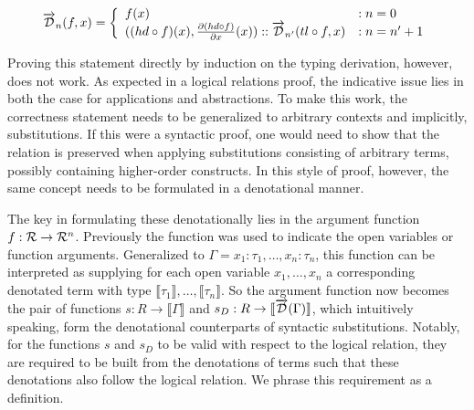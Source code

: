   \begin{equation}
    \overrightarrow{\mathcal{D}}_n(f, x) =
      \left\{
        \begin{array}{ll}
          f(x) & : n = 0 \\
          ((hd \circ f)(x), \frac{\partial{(hd \circ f)}}{\partial{x}}(x)) :: \overrightarrow{\mathcal{D}}_{n'}(tl \circ f, x) & : n = n' + 1 \\
        \end{array}
      \right.
  \label{eqn:argument_df}
  \end{equation}

  Proving this statement directly by induction on the typing derivation, however, does not work.
  As expected in a logical relations proof, the indicative issue lies in both the case for applications and abstractions.
  To make this work, the correctness statement needs to be generalized to arbitrary contexts and implicitly, substitutions.
  If this were a syntactic proof, one would need to show that the relation is preserved when applying substitutions consisting of arbitrary terms, possibly containing higher-order constructs.
  In this style of proof, however, the same concept needs to be formulated in a denotational manner.

  The key in formulating these denotationally lies in the argument function $f : \mathcal{R} \to \mathcal{R}^n$.
  Previously the function was used to indicate the open variables or function arguments.
  Generalized to $\Gamma = x_1 : \tau_1, \dots, x_n : \tau_n$, this function can be interpreted as supplying for each open variable $x_1, \dots, x_n$ a corresponding denotated term with type $\llbracket \tau_1 \rrbracket, \dots, \llbracket \tau_n \rrbracket$.
  So the argument function now becomes the pair of functions $s : R \rightarrow \llbracket \Gamma \rrbracket$ and $s_D : R \rightarrow \llbracket \overrightarrow{\mathcal{D}}(\Gamma) \rrbracket$, which intuitively speaking, form the denotational counterparts of syntactic substitutions.
  Notably, for the functions $s$ and $s_D$ to be valid with respect to the logical relation, they are required to be built from the denotations of terms such that these denotations also follow the logical relation.
  We phrase this requirement as a definition.


